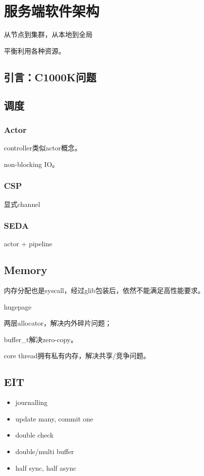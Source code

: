 \chapter{服务端软件架构}

从节点到集群，从本地到全局

平衡利用各种资源。

\section{引言：C1000K问题}

\section{调度}

\subsection{Actor}

controller类似actor概念。

non-blocking IO。

\subsection{CSP}

显式channel

\subsection{SEDA}

actor + pipeline

\section{Memory}

内存分配也是syscall，经过glib包装后，依然不能满足高性能要求。

\begin{enumbox}
\item hugepage
\item 两层allocator，解决内外碎片问题；
\item buffer\_t解决zero-copy。
\item core thread拥有私有内存，解决共享/竞争问题。
\end{enumbox}

\section{EIT}

\begin{itemize}
    \item journalling
    \item update many, commit one
    \item double check
    \item double/multi buffer
    \item half sync, half async
\end{itemize}
